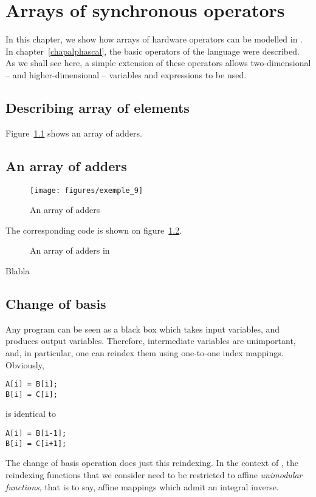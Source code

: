 \chapter{Arrays of synchronous operators}
\label{chapalphaarray}
In this chapter, we show how arrays of hardware operators can be modelled in
{\alfa}. In chapter~\ref{chapalphascal}, the basic
operators of the language were described. As we shall see here, a 
simple extension of these operators allows two-dimensional -- and
higher-dimensional -- variables and expressions to be used. 

\section{Describing array of elements}
Figure~\ref{adder-array} shows an array of adders. 
\section{An array of adders}
\begin{figure}[htbp]
\centerline{\texttt{[image: figures/exemple\_9]}}
\caption{An array of adders}\label{adder-array}
\end{figure}

The corresponding {\alfa} code is shown on figure~\ref{adder-array-alpha}.
\begin{figure}[htbp]

\caption{An array of adders in {\alfa}}\label{adder-array-alpha}
\end{figure}
Blabla
\section{Change of basis}
Any {\alfa} program can be seen as a black box which takes input
variables, and produces output variables. Therefore, intermediate
variables are unimportant, and, in particular, one can reindex them
using one-to-one index mappings. Obviously, 
\begin{verbatim}
A[i] = B[i];
B[i] = C[i];
\end{verbatim}
is identical to 
\begin{verbatim}
A[i] = B[i-1];
B[i] = C[i+1];
\end{verbatim}
 The change of basis operation does just this reindexing. In the
context of {\alfa}, the reindexing functions that we consider need to
be restricted to affine {\em unimodular functions}, that is to say, affine mappings
which admit an integral inverse.

